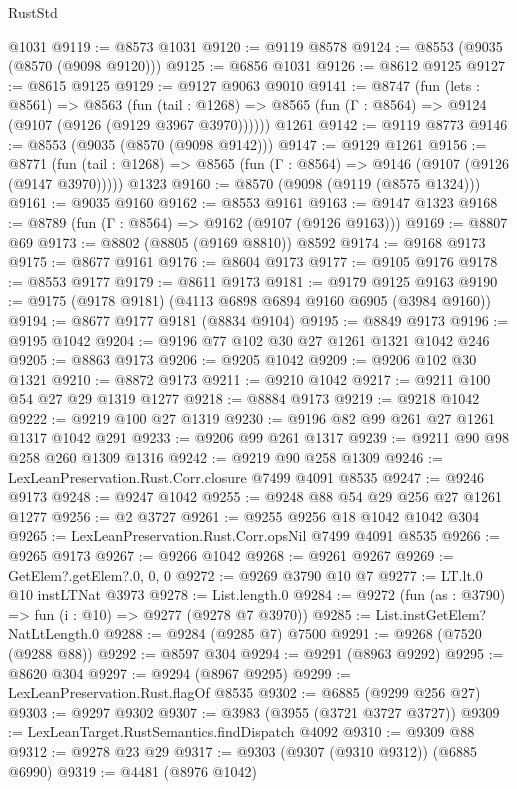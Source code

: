 \begin{lexlean}{RustStd}
\begin{coremodule}
    @1031
@9119 := @8573 @1031
@9120 := @9119 @8578
@9124 := @8553 (@9035 (@8570 (@9098 @9120)))
@9125 := @6856 @1031
@9126 := @8612 @9125
@9127 := @8615 @9125
@9129 := @9127 @9063 @9010
@9141 := @8747
    (fun (lets : @8561) =>
    @8563
      (fun (tail : @1268) => @8565 (fun (Γ : @8564) => @9124 (@9107 (@9126 (@9129 @3967 @3970))))))
    @1261
@9142 := @9119 @8773
@9146 := @8553 (@9035 (@8570 (@9098 @9142)))
@9147 := @9129 @1261
@9156 := @8771
    (fun (tail : @1268) => @8565 (fun (Γ : @8564) => @9146 (@9107 (@9126 (@9147 @3970)))))
    @1323
@9160 := @8570 (@9098 (@9119 (@8575 @1324)))
@9161 := @9035 @9160
@9162 := @8553 @9161
@9163 := @9147 @1323
@9168 := @8789 (fun (Γ : @8564) => @9162 (@9107 (@9126 @9163)))
@9169 := @8807 @69
@9173 := @8802 (@8805 (@9169 @8810)) @8592
@9174 := @9168 @9173
@9175 := @8677 @9161
@9176 := @8604 @9173
@9177 := @9105 @9176
@9178 := @8553 @9177
@9179 := @8611 @9173
@9181 := @9179 @9125 @9163
@9190 := @9175 (@9178 @9181) (@4113 @6898 @6894 @9160 @6905 (@3984 @9160))
@9194 := @8677 @9177 @9181 (@8834 @9104)
@9195 := @8849 @9173
@9196 := @9195 @1042
@9204 := @9196 @77 @102 @30 @27 @1261 @1321 @1042 @246
@9205 := @8863 @9173
@9206 := @9205 @1042
@9209 := @9206 @102 @30 @1321
@9210 := @8872 @9173
@9211 := @9210 @1042
@9217 := @9211 @100 @54 @27 @29 @1319 @1277
@9218 := @8884 @9173
@9219 := @9218 @1042
@9222 := @9219 @100 @27 @1319
@9230 := @9196 @82 @99 @261 @27 @1261 @1317 @1042 @291
@9233 := @9206 @99 @261 @1317
@9239 := @9211 @90 @98 @258 @260 @1309 @1316
@9242 := @9219 @90 @258 @1309
@9246 := LexLeanPreservation.Rust.Corr.closure @7499 @4091 @8535
@9247 := @9246 @9173
@9248 := @9247 @1042
@9255 := @9248 @88 @54 @29 @256 @27 @1261 @1277
@9256 := @2 @3727
@9261 := @9255 @9256 @18 @1042 @1042 @304
@9265 := LexLeanPreservation.Rust.Corr.opsNil @7499 @4091 @8535
@9266 := @9265 @9173
@9267 := @9266 @1042
@9268 := @9261 @9267
@9269 := GetElem?.getElem?.{0, 0, 0}
@9272 := @9269 @3790 @10 @7
@9277 := LT.lt.{0} @10 instLTNat @3973
@9278 := List.length.{0}
@9284 := @9272 (fun (as : @3790) => fun (i : @10) => @9277 (@9278 @7 @3970))
@9285 := List.instGetElem?NatLtLength.{0}
@9288 := @9284 (@9285 @7) @7500
@9291 := @9268 (@7520 (@9288 @88))
@9292 := @8597 @304
@9294 := @9291 (@8963 @9292)
@9295 := @8620 @304
@9297 := @9294 (@8967 @9295)
@9299 := LexLeanPreservation.Rust.flagOf @8535
@9302 := @6885 (@9299 @256 @27)
@9303 := @9297 @9302
@9307 := @3983 (@3955 (@3721 @3727 @3727))
@9309 := LexLeanTarget.RustSemantics.findDispatch @4092
@9310 := @9309 @88
@9312 := @9278 @23 @29
@9317 := @9303 (@9307 (@9310 @9312)) (@6885 @6990)
@9319 := @4481 (@8976 @1042)

\end{coremodule}
\end{lexlean}
